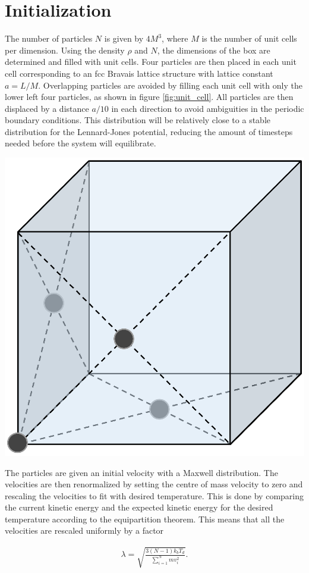 \section{Initialization}
The number of particles $N$ is given by $4M^3$, where $M$ is the number of unit cells per dimension. Using the density $\rho$ and $N$, the dimensions of the box are determined and filled with unit cells. Four particles are then placed in each unit cell corresponding to an fcc Bravais lattice structure with lattice constant $a=L/M$. Overlapping particles are avoided by filling each unit cell with only the lower left four particles, as shown in figure \ref{fig:unit_cell}. All particles are then displaced by a distance $a/10$ in each direction to avoid ambiguities in the periodic boundary conditions. This distribution will be relatively close to a stable distribution for the Lennard-Jones potential, reducing the amount of timesteps needed before the system will equilibrate.
\begin{Figure}
 \centering
 \includegraphics[width=0.35\linewidth]{fcc_cell.eps}
 \label{fig:unit_cell}
\end{Figure}

The particles are given an initial velocity with a Maxwell distribution\cite{jos}. The velocities are then renormalized by setting the centre of mass velocity to zero and rescaling the velocities to fit with desired temperature. This is done by comparing the current kinetic energy and the expected kinetic energy for the desired temperature according to the equipartition theorem. This means that all the velocities are rescaled uniformly by a factor

\begin{gather*}
\lambda = \sqrt{\frac{3\left(N-1\right)k_bT_d}{\sum_{i=1}^Nmv_i^2}}.
\end{gather*}

